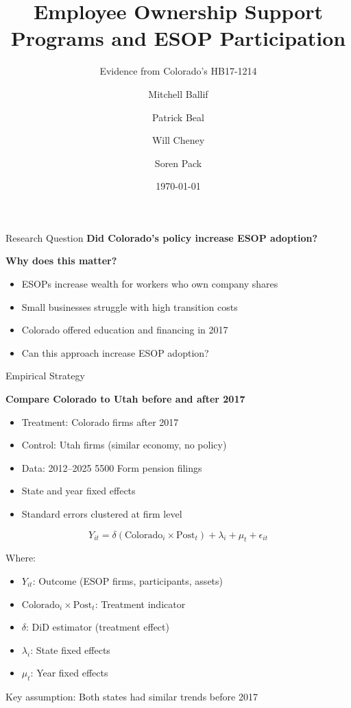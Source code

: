 \documentclass{beamer}
\title{Employee Ownership Support Programs and ESOP Participation}
\subtitle{Evidence from Colorado's HB17-1214}
\author{Mitchell Ballif \and Patrick Beal \and Will Cheney \and Soren Pack}
\date{\today}
\institute{}
\begin{document}
\begin{frame}
\titlepage
\end{frame}

\begin{frame}{Research Question}
\LARGE
\textbf{Did Colorado's policy increase ESOP adoption?}

\vspace{2em}
\large

\textbf{Why does this matter?}

\begin{itemize}
    \item ESOPs increase wealth for workers who own company shares
    \item Small businesses struggle with high transition costs
    \item Colorado offered education and financing in 2017
    \item Can this approach increase ESOP adoption?
\end{itemize}

\end{frame}

\begin{frame}{Empirical Strategy}

\large
\textbf{Compare Colorado to Utah before and after 2017}



\begin{itemize}
    \item Treatment: Colorado firms after 2017
    \item Control: Utah firms (similar economy, no policy)
    \item Data: 2012--2025 5500 Form pension filings
    \item State and year fixed effects
    \item Standard errors clustered at firm level
\end{itemize}

\[
Y_{it} = \delta (\text{Colorado}_i \times \text{Post}_t) + \lambda_i + \mu_t + \epsilon_{it}
\]



Where:
\begin{itemize}
    \footnotesize
    \item $Y_{it}$: Outcome (ESOP firms, participants, assets)
    \item $\text{Colorado}_i \times \text{Post}_t$: Treatment indicator
    \item $\delta$: DiD estimator (treatment effect)
    \item $\lambda_i$: State fixed effects
    \item $\mu_t$: Year fixed effects
\end{itemize}

\vspace{0.5em}
\normalsize
Key assumption: Both states had similar trends before 2017

\end{frame}
\end{document}
